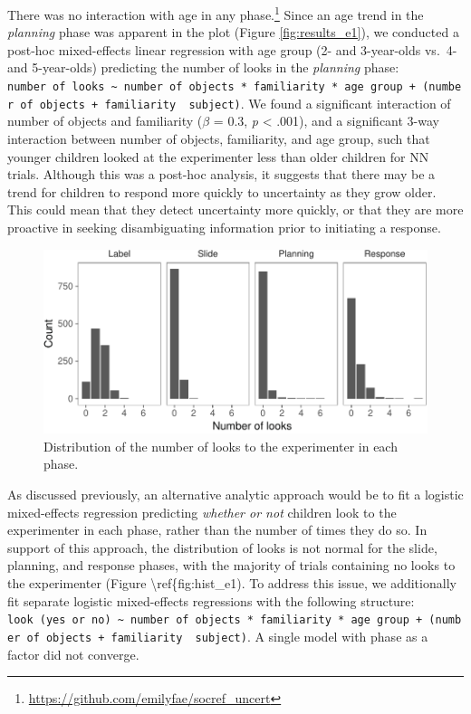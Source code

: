 \documentclass[a4paper,man,apacite,floatsintext]{apa6}
\newenvironment{CodeChunk}{}{}
\begin{document}
There was no interaction with age in any phase.\footnote{\url{https://github.com/emilyfae/socref_uncert}}
Since an age trend in the \emph{planning} phase was apparent in the plot
(Figure \ref{fig:results_e1}), we conducted a post-hoc mixed-effects
linear regression with age group (2- and 3-year-olds vs.~4- and
5-year-olds) predicting the number of looks in the \emph{planning}
phase:
\texttt{number\ of\ looks\ \textasciitilde{}\ number\ of\ objects\ *\ familiarity\ *\ age\ group\ +\ (number\ of\ objects\ +\ familiarity\ \textbar{}\ subject)}.
We found a significant interaction of number of objects and familiarity
(\(\beta\) = 0.3, \emph{p} \textless{} .001), and a significant 3-way
interaction between number of objects, familiarity, and age group, such
that younger children looked at the experimenter less than older
children for NN trials. Although this was a post-hoc analysis, it
suggests that there may be a trend for children to respond more quickly
to uncertainty as they grow older. This could mean that they detect
uncertainty more quickly, or that they are more proactive in seeking
disambiguating information prior to initiating a response.

\begin{CodeChunk}
\begin{figure}[b]

{\centering \includegraphics{figs/hist_e1-1} 

}

\caption[Distribution of the number of looks to the experimenter in each phase]{Distribution of the number of looks to the experimenter in each phase.}\label{fig:hist_e1}
\end{figure}
\end{CodeChunk}

As discussed previously, an alternative analytic approach would be to
fit a logistic mixed-effects regression predicting \emph{whether or not}
children look to the experimenter in each phase, rather than the number
of times they do so. In support of this approach, the distribution of
looks is not normal for the slide, planning, and response phases, with
the majority of trials containing no looks to the experimenter (Figure
\textbackslash{}ref\{fig:hist\_e1). To address this issue, we
additionally fit separate logistic mixed-effects regressions with the
following structure:
\texttt{look\ (yes\ or\ no)\ \textasciitilde{}\ number\ of\ objects\ *\ familiarity\ *\ age\ group\ +\ (number\ of\ objects\ +\ familiarity\ \textbar{}\ subject)}.
A single model with phase as a factor did not converge.
\end{document}
